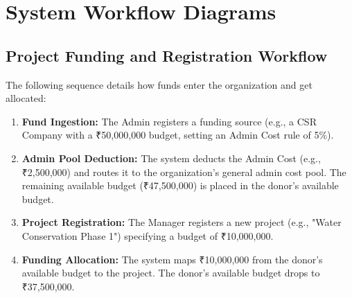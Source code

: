 \documentclass[11pt,a4paper]{article}
\begin{document}
\newpage
\section{System Workflow Diagrams}

\subsection{Project Funding and Registration Workflow}
The following sequence details how funds enter the organization and get allocated:
\begin{enumerate}
    \item \textbf{Fund Ingestion:} The Admin registers a funding source (e.g., a CSR Company with a ₹50,000,000 budget, setting an Admin Cost rule of 5\%).
    \item \textbf{Admin Pool Deduction:} The system deducts the Admin Cost (e.g., ₹2,500,000) and routes it to the organization's general admin cost pool. The remaining available budget (₹47,500,000) is placed in the donor's available budget.
    \item \textbf{Project Registration:} The Manager registers a new project (e.g., "Water Conservation Phase 1") specifying a budget of ₹10,000,000.
    \item \textbf{Funding Allocation:} The system maps ₹10,000,000 from the donor's available budget to the project. The donor's available budget drops to ₹37,500,000.
\end{enumerate}
\end{document}

